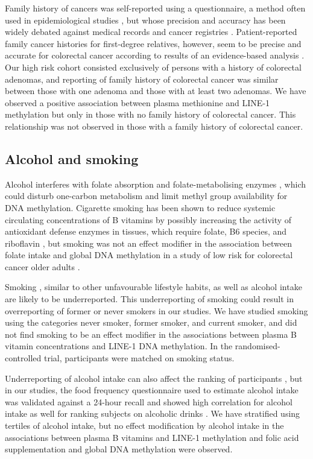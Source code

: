 \noindent Family history of cancers was self-reported using a questionnaire, a method often used in epidemiological studies \cite{c773,c774}, but whose precision and accuracy has been widely debated against medical records and cancer registries \cite{c775,c776,c777}. Patient-reported family cancer histories for first-degree relatives, however, seem to be precise and accurate for colorectal cancer according to results of an evidence-based analysis \cite{c778}. Our high risk cohort consisted exclusively of persons with a history of colorectal adenomas, and reporting of family history of colorectal cancer was similar between those with one adenoma and those with at least two adenomas. We have observed a positive association between plasma methionine and LINE-1 methylation but only in those with no family history of colorectal cancer. This relationship was not observed in those with a family history of colorectal cancer. 
 
\subsection{Alcohol and smoking} %
\noindent Alcohol interferes with folate absorption and folate-metabolising enzymes \cite{c779}, which could disturb one-carbon metabolism and limit methyl group availability for DNA methylation. Cigarette smoking has been shown to reduce systemic circulating concentrations of B vitamins by possibly increasing the activity of antioxidant defense enzymes in tissues, which require folate, B6 species, and riboflavin \cite{c780}, but smoking was not an effect modifier in the association between folate intake and global DNA methylation in a study of low risk for colorectal cancer older adults \cite{c79}. 
 
\noindent Smoking \cite{c781}, similar to other unfavourable lifestyle habits, as well as alcohol intake \cite{c782} are likely to be underreported. This underreporting of smoking could result in overreporting of former or never smokers in our studies. We have studied smoking using the categories never smoker, former smoker, and current smoker, and did not find smoking to be an effect modifier in the associations between plasma B vitamin concentrations and LINE-1 DNA methylation. In the randomised-controlled trial, participants were matched on smoking status. 
 
\noindent Underreporting of alcohol intake can also affect the ranking of participants \cite{c782}, but in our studies, the food frequency questionnaire used to estimate alcohol intake was validated against a 24-hour recall and showed high correlation for alcohol intake \cite{c783} as well for ranking subjects on alcoholic drinks \cite{c784}. We have stratified using tertiles of alcohol intake, but no effect modification by alcohol intake in the associations between plasma B vitamins and LINE-1 methylation and folic acid supplementation and global DNA methylation were observed. 
 
